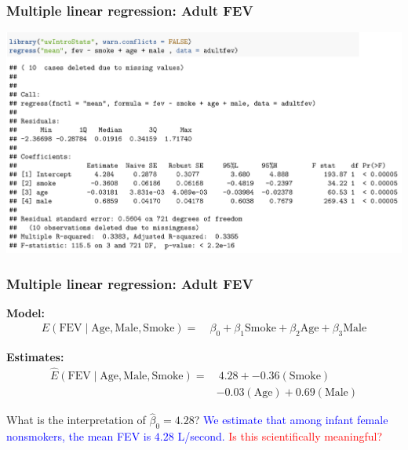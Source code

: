 \documentclass[12pt, 
hyperref={colorlinks=true, linkcolor=blue, urlcolor=cyan}]{beamer}
\begin{document}
\begin{frame}
\frametitle{Multiple linear regression: Adult FEV}
\begin{center}
\vspace{-1cm}\hspace*{-0.5cm}\includegraphics[width=1.1\textwidth]{plots/fev_vs_smoke_adjust_adultfev_noheight.png}
\end{center}
\end{frame}

\begin{frame}
\frametitle{Multiple linear regression: Adult FEV}
\vspace{-1cm}\textbf{Model:} {\small \begin{align*}
E(\text{FEV} \mid \text{Age}, \text{Male}, \text{Smoke}) =& \ \beta_0 + \beta_1 \text{Smoke} + \beta_2 \text{Age} + \beta_3 \text{Male} 
\end{align*} } \vspace{-1cm}

\textbf{Estimates:}
{\small \begin{align*}
\widehat{E}(\text{FEV} \mid \text{Age}, \text{Male}, \text{Smoke}) =& \ 4.28 + -0.36 (\text{Smoke}) \\
& -0.03 (\text{Age}) + 0.69 (\text{Male}) 
\end{align*} } \vspace{-1cm}

What is the interpretation of $\hat{\beta}_0 = 4.28$? \pause \textcolor{blue}{We estimate that among infant female nonsmokers, the mean FEV is $4.28$ L/second.} \textcolor{red}{Is this scientifically meaningful?}
\end{frame}
\end{document}
